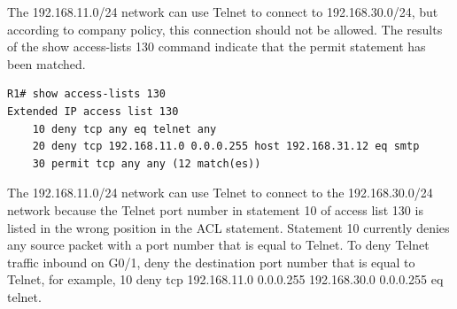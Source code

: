 \begin{example}
The 192.168.11.0/24 network can use Telnet to connect to 192.168.30.0/24, but according to company policy, this connection should not be allowed. The results of the show access-lists 130 command indicate that the permit statement has been matched.
\begin{verbatim}
R1# show access-lists 130
Extended IP access list 130
    10 deny tcp any eq telnet any
    20 deny tcp 192.168.11.0 0.0.0.255 host 192.168.31.12 eq smtp
    30 permit tcp any any (12 match(es))
\end{verbatim}
The 192.168.11.0/24 network can use Telnet to connect to the 192.168.30.0/24 network because the Telnet port number in statement 10 of access list 130 is listed in the wrong position in the ACL statement. Statement 10 currently denies any source packet with a port number that is equal to Telnet. To deny Telnet traffic inbound on G0/1, deny the destination port number that is equal to Telnet, for example, 10 deny tcp 192.168.11.0 0.0.0.255 192.168.30.0 0.0.0.255 eq telnet.
\end{example}